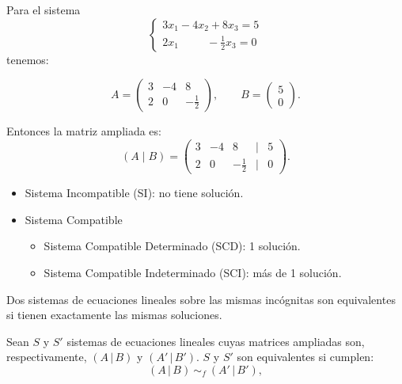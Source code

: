 \documentclass[a4paper,12pt]{article}
\begin{document}
\begin{ejemplo}[title=Ejemplo de matriz ampliada]
Para el sistema
\[
\begin{cases}
3x_1 - 4x_2 + 8x_3 = 5 \\
2x_1 \;\;\;\;\;\;\;\;\; - \tfrac12 x_3 = 0
\end{cases}
\]
tenemos:

\[
A=
\begin{pmatrix}
3 & -4 & 8 \\
2 & 0 & -\tfrac12
\end{pmatrix},
\qquad
B =
\begin{pmatrix}
5 \\ 0
\end{pmatrix}.
\]

Entonces la matriz ampliada es:
\[
(A \mid B) =
\begin{pmatrix}
3 & -4 & 8 & \big| & 5 \\
2 & 0 & -\tfrac12 & \big| & 0
\end{pmatrix}.
\]
\end{ejemplo}

\begin{procedimiento}[title=Tipos de sistemas]
\begin{itemize}
    \item Sistema Incompatible (SI): no tiene solución.
    \item Sistema Compatible
    \begin{itemize}
        \item Sistema Compatible Determinado (SCD): 1 solución.
        \item Sistema Compatible Indeterminado (SCI): más de 1 solución.
    \end{itemize}
\end{itemize}
\end{procedimiento}

\begin{procedimiento}[title=Sistemas equivalentes]
Dos sistemas de ecuaciones lineales sobre las mismas incógnitas son equivalentes si tienen exactamente las mismas soluciones.

\vspace{0.5em}

Sean $S$ y $S'$ sistemas de ecuaciones lineales cuyas matrices ampliadas son, 
respectivamente, $(A\,|\,B)$ y $(A'\,|\,B')$.  
$S$ y $S'$ son equivalentes si cumplen:
\[
(A\,|\,B)\ \sim_f\ (A'\,|\,B'),
\]
\end{procedimiento}
\end{document}
